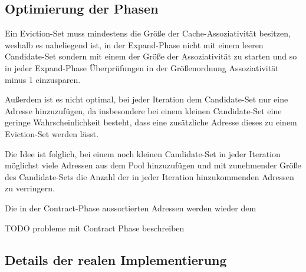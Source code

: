 
\subsection{Optimierung der Phasen}

Ein Eviction-Set muss mindestens die Größe der Cache-Assoziativität besitzen, weshalb es naheliegend ist, in der Expand-Phase nicht mit einem leeren Candidate-Set sondern mit einem der Größe der Assoziativität zu starten und so in jeder Expand-Phase Überprüfungen in der Größenordnung Assoziativität minus 1 einzusparen.

Außerdem ist es nicht optimal, bei jeder Iteration dem Candidate-Set nur eine Adresse hinzuzufügen, da insbesondere bei einem kleinen Candidate-Set eine geringe Wahrscheinlichkeit besteht, dass eine zusätzliche Adresse dieses zu einem Eviction-Set werden lässt.

Die Idee ist folglich, bei einem noch kleinen Candidate-Set in jeder Iteration möglichst viele Adressen aus dem Pool hinzuzufügen und mit zunehmender Größe des Candidate-Sets die Anzahl der in jeder Iteration hinzukommenden Adressen zu verringern.

Die in der Contract-Phase aussortierten Adressen werden wieder dem

TODO probleme mit Contract Phase beschreiben



\subsection{Details der realen Implementierung}

